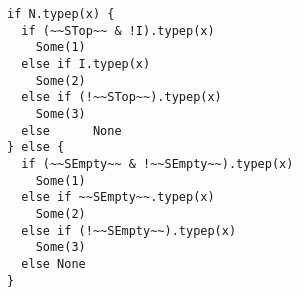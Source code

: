 \begin{lstlisting}[style=reclojureScala]
if N.typep(x) {
  if (~~STop~~ & !I).typep(x)
    Some(1)
  else if I.typep(x)
    Some(2)
  else if (!~~STop~~).typep(x)
    Some(3)
  else      None
} else {
  if (~~SEmpty~~ & !~~SEmpty~~).typep(x)
    Some(1)
  else if ~~SEmpty~~.typep(x)
    Some(2)
  else if (!~~SEmpty~~).typep(x)
    Some(3)
  else None
}
\end{lstlisting}
